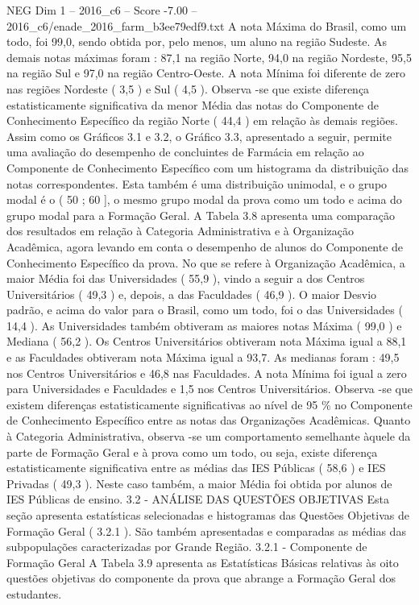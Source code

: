 \begin{textsample}{NEG Dim 1 – 2016\_c6 – Score -7.00 – 2016\_c6/enade\_2016\_farm\_b3ee79edf9.txt}
A nota Máxima do Brasil, como um todo, foi 99,0, sendo obtida por, pelo menos, um aluno na região Sudeste.
As demais notas máximas foram : 87,1 na região Norte, 94,0 na região Nordeste, 95,5 na região Sul e 97,0 na região Centro-Oeste.
A nota Mínima foi diferente de zero nas regiões Nordeste ( 3,5 ) e Sul ( 4,5 ).
Observa -se que existe diferença estatisticamente significativa da menor Média das notas do Componente de Conhecimento Específico da região Norte ( 44,4 ) em relação às demais regiões.
Assim como os Gráficos 3.1 e 3.2, o Gráfico 3.3, apresentado a seguir, permite uma avaliação do desempenho de concluintes de Farmácia em relação ao Componente de Conhecimento Específico com um histograma da distribuição das notas correspondentes.
Esta também é uma distribuição unimodal, e o grupo modal é o ( 50 ; 60 ], o mesmo grupo modal da prova como um todo e acima do grupo modal para a Formação Geral.
A Tabela 3.8 apresenta uma comparação dos resultados em relação à Categoria Administrativa e à Organização Acadêmica, agora levando em conta o desempenho de alunos do Componente de Conhecimento Específico da prova.
No que se refere à Organização Acadêmica, a maior Média foi das Universidades ( 55,9 ), vindo a seguir a dos Centros Universitários ( 49,3 ) e, depois, a das Faculdades ( 46,9 ).
O maior Desvio padrão, e acima do valor para o Brasil, como um todo, foi o das Universidades ( 14,4 ).
As Universidades também obtiveram as maiores notas Máxima ( 99,0 ) e Mediana ( 56,2 ).
Os Centros Universitários obtiveram nota Máxima igual a 88,1 e as Faculdades obtiveram nota Máxima igual a 93,7.
As medianas foram : 49,5 nos Centros Universitários e 46,8 nas Faculdades.
A nota Mínima foi igual a zero para Universidades e Faculdades e 1,5 nos Centros Universitários.
Observa -se que existem diferenças estatisticamente significativas ao nível de 95 \% no Componente de Conhecimento Específico entre as notas das Organizações Acadêmicas.
Quanto à Categoria Administrativa, observa -se um comportamento semelhante àquele da parte de Formação Geral e à prova como um todo, ou seja, existe diferença estatisticamente significativa entre as médias das IES Públicas ( 58,6 ) e IES Privadas ( 49,3 ).
Neste caso também, a maior Média foi obtida por alunos de IES Públicas de ensino. 3.2 - ANÁLISE DAS QUESTÕES OBJETIVAS Esta seção apresenta estatísticas selecionadas e histogramas das Questões Objetivas de Formação Geral ( 3.2.1 ).
São também apresentadas e comparadas as médias das subpopulações caracterizadas por Grande Região. 3.2.1 - Componente de Formação Geral A Tabela 3.9 apresenta as Estatísticas Básicas relativas às oito questões objetivas do componente da prova que abrange a Formação Geral dos estudantes.

\end{textsample}
